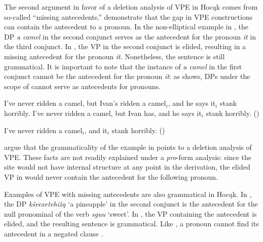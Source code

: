 \documentclass[output=paper]{LSP/langsci}
\begin{document}
 
The second argument in favor of a deletion analysis of VPE in Hocąk comes from so-called ``missing antecedents.'' \citet{HankamerSag1976} demonstrate that the gap in  VPE constructions can contain the antecedent to a pronoun. In the non-elliptical example in , the DP \emph{a camel} in the second conjunct serves as the antecedent for the pronoun \emph{it} in the third conjunct. In , the VP in the second conjunct is elided, resulting in a missing antecedent for the pronoun \emph{it}. Nonetheless, the sentence is still grammatical. It is important to note that the instance of \emph{a camel} in the first conjunct cannot be the antecedent for the pronoun \emph{it}: as  shows, DPs under the scope of  cannot serve as antecedents for pronouns.
 

 
\ea
\ea\label{ex:johnson:49a}
I've never ridden a camel, but Ivan's ridden a camel$_i$, and he says it$_i$ stank horribly.
\vspace{12pt}
\ex\label{ex:johnson:49b} 
I've never ridden a camel, but Ivan has, and he says it$_i$ stank horribly. (\citealt[403]{HankamerSag1976})
\z
\z
 
\ea\label{ex:johnson:50}
I've never ridden a camel$_i$, and it$_i$ stank horribly. (\citealt[404]{HankamerSag1976})\\
\z 

\citet{HankamerSag1976} argue that the grammaticality of the example in  points to a deletion analysis of VPE. These facts are not readily explained under a \emph{pro}-form analysis: since the  site would not have internal structure at any point in the derivation, the elided VP in  would never contain the antecedent for the following pronoun. 

 
Examples of VPE with missing antecedents are also grammatical in Hocąk. In , the DP \emph{kšeexetehižą} `a pineapple' in the second conjunct is the antecedent for the null pronominal  of the verb \emph{sguu} `sweet'. In , the VP containing the antecedent is elided, and the resulting sentence is grammatical. Like , a pronoun cannot find its antecedent in a negated clause .
 
\end{document}
